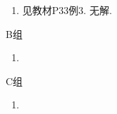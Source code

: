 \begin{enumerate}
    \item 见教材P33例3. 无解.
\end{enumerate}

\centerline{\heiti B组}
\begin{enumerate}
    \item
\end{enumerate}

\centerline{\heiti C组}
\begin{enumerate}
    \item
\end{enumerate}

\clearpage
